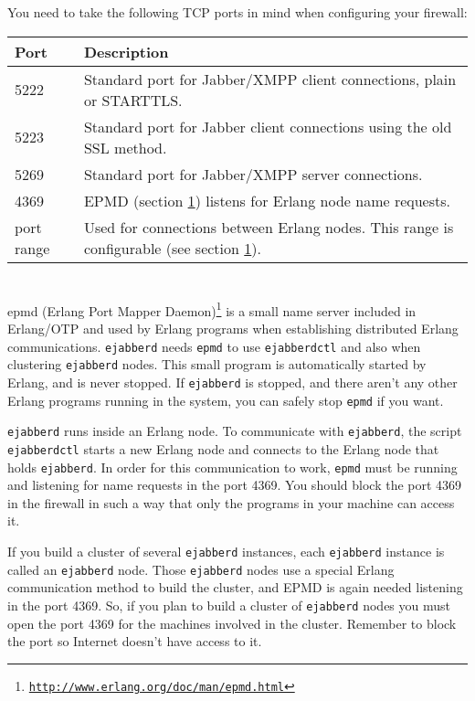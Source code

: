 \documentclass[a4paper,10pt]{book}
\newcommand{\makesection}[2]{ \aname{#1}{} \section{\ahrefloc{#1}{#2}} \label{#1} }
\newcommand{\term}[1]{\texttt{#1}}
\newcommand{\ejabberd}{\texttt{ejabberd}}
\gdef\footahref#1#2{#2\footnote{\href{#1}{\texttt{#1}}}}
\begin{document}
You need to take the following TCP ports in mind when configuring your firewall:
\begin{table}[H]
  \centering
  \begin{tabular}{|l|l|}
    \hline {\bf Port} & {\bf Description} \\
    \hline \hline 5222& Standard port for Jabber/XMPP client connections, plain or STARTTLS.\\
    \hline 5223& Standard port for Jabber client connections using the old SSL method.\\
    \hline 5269& Standard port for Jabber/XMPP server connections.\\
    \hline 4369& EPMD (section \ref{epmd}) listens for Erlang node name requests.\\
    \hline port range& Used for connections between Erlang nodes. This range is configurable (see section \ref{epmd}).\\
    \hline
  \end{tabular}
\end{table}

\makesection{epmd}{epmd}

\footahref{http://www.erlang.org/doc/man/epmd.html}{epmd (Erlang Port Mapper Daemon)}
is a small name server included in Erlang/OTP
and used by Erlang programs when establishing distributed Erlang communications.
\ejabberd{} needs \term{epmd} to use \term{ejabberdctl} and also when clustering \ejabberd{} nodes.
This small program is automatically started by Erlang, and is never stopped.
If \ejabberd{} is stopped, and there aren't any other Erlang programs
running in the system, you can safely stop \term{epmd} if you want.

\ejabberd{} runs inside an Erlang node.
To communicate with \ejabberd{}, the script \term{ejabberdctl} starts a new Erlang node
and connects to the Erlang node that holds \ejabberd{}.
In order for this communication to work,
\term{epmd} must be running and listening for name requests in the port 4369.
You should block the port 4369 in the firewall in such a way that
only the programs in your machine can access it.

If you build a cluster of several \ejabberd{} instances,
each \ejabberd{} instance is called an \ejabberd{} node.
Those \ejabberd{} nodes use a special Erlang communication method to
build the cluster, and EPMD is again needed listening in the port 4369.
So, if you plan to build a cluster of \ejabberd{} nodes
you must open the port 4369 for the machines involved in the cluster.
Remember to block the port so Internet doesn't have access to it.
\end{document}

